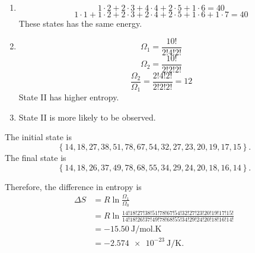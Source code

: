 \begin{@empty}
\begin{problem}
\end{problem}

\begin{problem}
\end{problem}

\begin{answer}
    \begin{enumerate}
        \item
            \[ 1\cdot2 + 2\cdot3 + 4\cdot4 + 2\cdot5 + 1\cdot6 = 40 \]
            \[ 1\cdot1 + 1\cdot2 + 2\cdot3 + 2\cdot4 + 2\cdot5 + 1\cdot6 + 1\cdot7 = 40 \]
            These states has the same energy.
        \item
            \[ \Omega_1 = \frac{10!}{2!4!2!} \]
            \[ \Omega_2 = \frac{10!}{2!2!2!} \]
            \[ \frac{\Omega_2}{\Omega_1} = \frac{2!4!2!}{2!2!2!} = 12 \]
            State II has higher entropy.
        \item State II is more likely to be observed.
    \end{enumerate}
\end{answer}

\begin{problem}
\end{problem}

\begin{problem}
\end{problem}

\begin{answer}
    The initial state is
    \[ \left\{ 14, 18, 27, 38, 51, 78, 67, 54, 32, 27, 23, 20, 19, 17, 15 \right\}.\]
    The final state is
    \[ \left\{ 14, 18, 26, 37, 49, 78, 68, 55, 34, 29, 24, 20, 18, 16, 14 \right\}.\]

    Therefore, the difference in entropy is
    \begin{align*}
        \Delta S &= R \ln \frac{\Omega_1}{\Omega_0} \\
        &= R \ln\frac{14!18!27!38!51!78!67!54!32!27!23!20!19!17!15!}
        {14!18!26!37!49!78!68!55!34!29!24!20!18!16!14!} \\
        &= \SI{-15.50}{\joule/\mol.\kelvin} \\
        &= \SI{-2.574e-23}{\joule/\kelvin}.
    \end{align*}
\end{answer}
\end{@empty}
